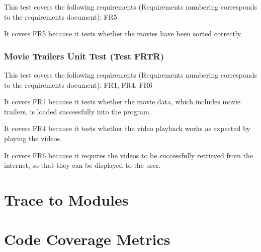 \documentclass[12pt, titlepage]{article}
\begin{document}
This test covers the following requirements (Requirements numbering corresponds to the requirements document): FR5

It covers FR5 because it tests whether the movies have been sorted correctly. 

\subsubsection{Movie Trailers Unit Test (Test FRTR)}

This test covers the following requirements (Requirements numbering corresponds to the requirements document): FR1, FR4, FR6
		
It covers FR1 because it tests whether the movie data, which includes movie trailers, is loaded successfully into the program. 

It covers FR4 because it tests whether the video playback works as expected by playing the videos. 

It covers FR6 because it requires the videos to be successfully retrieved from the internet, so that they can be displayed to the user. 
 
\section{Trace to Modules}		

\section{Code Coverage Metrics}
\end{document}
